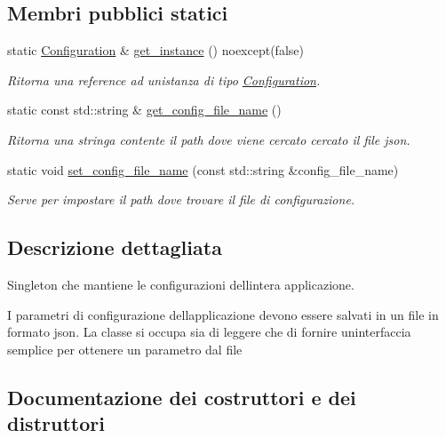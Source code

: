\subsection*{Membri pubblici statici}
\begin{DoxyCompactItemize}
\item 
static \mbox{\hyperlink{classmm_1_1_configuration}{Configuration}} \& \mbox{\hyperlink{classmm_1_1_configuration_a5cfc5ea56062f53ef9fbd274f6dbe79e}{get\+\_\+instance}} () noexcept(false)
\begin{DoxyCompactList}\small\item\em Ritorna una reference ad un\textquotesingle{}istanza di tipo {\ttfamily \mbox{\hyperlink{classmm_1_1_configuration}{Configuration}}}. \end{DoxyCompactList}\item 
static const std\+::string \& \mbox{\hyperlink{classmm_1_1_configuration_a631c8525beb91fb55d72eb6b58d2d68f}{get\+\_\+config\+\_\+file\+\_\+name}} ()
\begin{DoxyCompactList}\small\item\em Ritorna una stringa contente il path dove viene cercato cercato il file json. \end{DoxyCompactList}\item 
static void \mbox{\hyperlink{classmm_1_1_configuration_ad526b28d1a7f8c6f854352b840d2d7b4}{set\+\_\+config\+\_\+file\+\_\+name}} (const std\+::string \&config\+\_\+file\+\_\+name)
\begin{DoxyCompactList}\small\item\em Serve per impostare il path dove trovare il file di configurazione. \end{DoxyCompactList}\end{DoxyCompactItemize}


\subsection{Descrizione dettagliata}
Singleton che mantiene le configurazioni dell\textquotesingle{}intera applicazione. 

I parametri di configurazione dell\textquotesingle{}applicazione devono essere salvati in un file in formato json. La classe si occupa sia di leggere che di fornire un\textquotesingle{}interfaccia semplice per ottenere un parametro dal file 

\subsection{Documentazione dei costruttori e dei distruttori}
\mbox{\label{classmm_1_1_configuration_a71e5c0e1ad7d82d6a14895a4e85d83b7}} 
